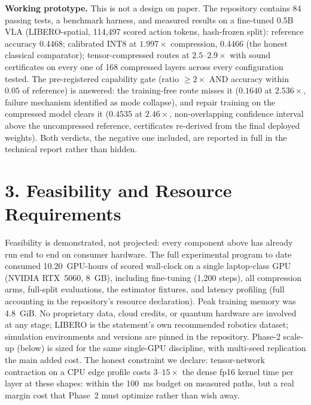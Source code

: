 \documentclass[10pt]{article}
\begin{document}
\textbf{Working prototype.} This is not a design on paper. The repository
contains 84 passing tests, a benchmark harness, and measured results on a
fine-tuned 0.5B VLA (LIBERO-spatial, 114{,}497 scored action tokens,
hash-frozen split): reference accuracy 0.4468; calibrated INT8 at
$1.997\times$ compression, 0.4466 (the honest classical comparator);
tensor-compressed routes at $2.5$--$2.9\times$ with sound certificates on
every one of 168 compressed layers across every configuration tested. The
pre-registered capability gate (ratio $\ge 2\times$ AND accuracy within
$0.05$ of reference) is answered: the training-free route misses it
($0.1640$ at $2.536\times$, failure mechanism identified as mode collapse),
and repair training on the compressed model clears it ($0.4535$ at
$2.46\times$, non-overlapping confidence interval above the uncompressed
reference, certificates re-derived from the final deployed weights). Both
verdicts, the negative one included, are reported in full in the technical
report rather than hidden.

\section*{3. Feasibility and Resource Requirements}
Feasibility is demonstrated, not projected: every component above has already
run end to end on consumer hardware. The full experimental program to date
consumed 10.20~GPU-hours of scored wall-clock on a single laptop-class GPU
(NVIDIA RTX~5060, 8~GB), including fine-tuning (1{,}200 steps), all compression
arms, full-split evaluations, the estimator fixtures, and latency profiling
(full accounting in the repository's resource declaration). Peak training
memory was 4.8~GiB. No proprietary data, cloud credits, or quantum hardware
are involved at any stage; LIBERO is the statement's own recommended robotics
dataset; simulation environments and versions are pinned in the repository.
Phase-2 scale-up (below) is sized for the same single-GPU discipline, with
multi-seed replication the main added cost. The honest constraint we declare:
tensor-network contraction on a CPU edge profile costs $3$--$15\times$ the
dense fp16 kernel time per layer at these shapes: within the 100~ms budget
on measured paths, but a real margin cost that Phase~2 must optimize rather
than wish away.

\end{document}

